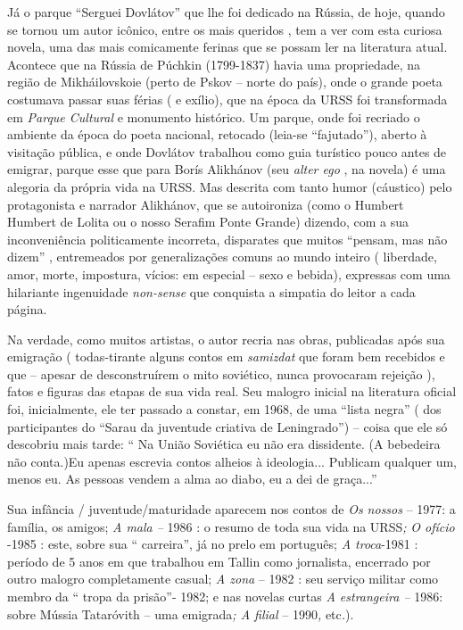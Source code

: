 Já o parque ``Serguei Dovlátov'' que lhe foi dedicado na Rússia, de
hoje, quando se tornou um autor icônico, entre os mais queridos , tem a
ver com esta curiosa novela, uma das mais comicamente ferinas que se
possam ler na literatura atual. Acontece que na Rússia de Púchkin
(1799-1837) havia uma propriedade, na região de Mikháilovskoie (perto de
Pskov -- norte do país), onde o grande poeta costumava passar suas
férias ( e exílio), que na época da URSS foi transformada em
\emph{Parque Cultural} e monumento histórico. Um parque, onde foi
recriado o ambiente da época do poeta nacional, retocado (leia-se
``fajutado''), aberto à visitação pública, e onde Dovlátov trabalhou
como guia turístico pouco antes de emigrar, parque esse que para Borís
Alikhánov (seu \emph{alter ego} , na novela) é uma alegoria da própria
vida na URSS. Mas descrita com tanto humor (cáustico) pelo protagonista
e narrador Alikhánov, que se autoironiza (como o Humbert Humbert de
Lolita ou o nosso Serafim Ponte Grande) dizendo, com a sua
inconveniência politicamente incorreta, disparates que muitos ``pensam,
mas não dizem'' , entremeados por generalizações comuns ao mundo inteiro
( liberdade, amor, morte, impostura, vícios: em especial -- sexo e
bebida), expressas com uma hilariante ingenuidade \emph{non-sense} que
conquista a simpatia do leitor a cada página.

Na verdade, como muitos artistas, o autor recria nas obras, publicadas
após sua emigração ( todas-tirante alguns contos em \emph{samizdat} que
foram bem recebidos e que -- apesar de desconstruírem o mito soviético,
nunca provocaram rejeição ), fatos e figuras das etapas de sua vida
real. Seu malogro inicial na literatura oficial foi, inicialmente, ele
ter passado a constar, em 1968, de uma ``lista negra'' ( dos
participantes do ``Sarau da juventude criativa de Leningrado'') -- coisa
que ele só descobriu mais tarde: `` Na União Soviética eu não era
dissidente. (A bebedeira não conta.)Eu apenas escrevia contos alheios à
ideologia... Publicam qualquer um, menos eu. As pessoas vendem a alma ao
diabo, eu a dei de graça...''

Sua infância / juventude/maturidade aparecem nos contos de \emph{Os
nossos} -- 1977: a família, os amigos; \emph{A mala --} 1986 : o resumo
de toda sua vida na URSS\emph{;} \emph{O ofício} -1985 : este, sobre sua
`` carreira'', já no prelo em português; \emph{A troca}-1981 : período
de 5 anos em que trabalhou em Tallin como jornalista, encerrado por
outro malogro completamente casual; \emph{A zona} -- 1982 : seu serviço
militar como membro da `` tropa da prisão''- 1982; e nas novelas curtas
\emph{A estrangeira --} 1986: sobre Mússia Tataróvith -- uma
emigrada\emph{; A filial} -- 1990\emph{,} etc\emph{.}).

